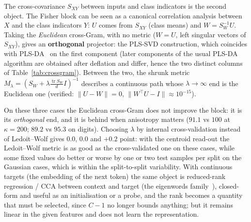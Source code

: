 \documentclass[11pt,a4paper]{article}
\theoremstyle{plain}
\theoremstyle{definition}
\theoremstyle{remark}
\newcommand{\tr}{\operatorname{tr}}
\newcommand{\T}{\top}
\begin{document}
The cross-covariance $S_{XY}$ between inputs and class indicators is the
second object. The Fisher block can be seen as a canonical correlation
analysis between $X$ and the class indicators $Y$: $U$ comes from $S_{XY}$
(class means) and $W=S_W^{-1}U$. Taking the \emph{Euclidean} cross-Gram, with
no metric ($W=U$, left singular vectors of $S_{XY}$), gives an
\textbf{orthogonal} projector: the PLS-SVD construction, which coincides
with PLS-DA~\cite{barkerrayens2003} on the first component (later components
of the usual PLS-DA algorithm are obtained after deflation and differ,
hence the two distinct columns of Table~\ref{tab:crossgram}). Between the
two, the shrunk metric $M_\lambda=(S_W+\lambda\tfrac{\tr S_W}{d}I)^{-1}$
describes a continuous path whose $\lambda\to\infty$ end is the Euclidean
one (verified: $\|U-W\|=0$, $\|W^\T U-I\|\approx10^{-15}$).
\begin{table}[h]
\centering\small\renewcommand{\arraystretch}{1.12}
\caption{Shrinkage path from the Fisher block to the Euclidean cross-Gram: test accuracy in \%, 5 splits 70/30 of a fixed dataset (18 test samples per split on the Gaussian cases); every block uses the centroid read-out on its code (the LDA rule only for the Fisher metric). ``$\lambda$ CV'': $\lambda\in\{0.01,0.1,1,10\}$ chosen by 3-fold cross-validation inside the training part; the $\lambda=\dots$ columns are fixed values.}
\label{tab:crossgram}
\end{table}
On these three cases the Euclidean cross-Gram does not improve the block: it
is its \emph{orthogonal} end, and it is behind when anisotropy matters
($91.1$ vs $100$ at $\kappa=200$; $89.2$ vs $95.3$ on digits). Choosing
$\lambda$ by internal cross-validation instead of Ledoit--Wolf gives $0.0$,
$0.0$ and $+0.2$ point: with the centroid read-out the Ledoit--Wolf metric
is as good as the cross-validated one on these cases, while some fixed
values do better or worse by one or two test samples per split on the
Gaussian cases, which is within the split-to-split variability.
With continuous targets (the embedding of the next token) the same object is
reduced-rank regression / CCA between context and target (the eigenwords
family~\cite{dhillon2015eigenwords}), closed-form and useful as an initialisation or a probe, and the
rank becomes a quantity that must be selected, since $C-1$ no longer bounds
anything; but it remains linear in the given features and does not learn the
representation.
\end{document}
